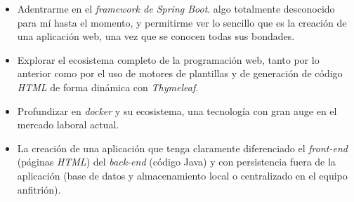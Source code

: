 \begin{itemize}
	\item Adentrarme en el \textit{framework de Spring Boot}. algo totalmente desconocido para mí hasta el momento, y permitirme ver lo sencillo que es la creación de una aplicación web, una vez que se conocen todas sus bondades.
	\item Explorar el ecosistema completo de la programación web, tanto por lo anterior como por el uso de motores de plantillas y de generación de código \textit{HTML} de forma dinámica con \textit{Thymeleaf}.
	\item Profundizar en \textit{docker} y su ecosistema, una tecnología con gran auge en el mercado laboral actual.
	\item La creación de una aplicación que tenga claramente diferenciado el \textit{front-end} (páginas \textit{HTML}) del \textit{back-end} (código Java) y con persistencia fuera de la aplicación (base de datos y almacenamiento local o centralizado en el equipo anfitrión).
\end{itemize}